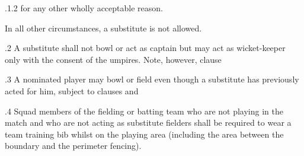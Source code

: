 \documentclass[12pt]{article}
\begin{document}
\vspace{\baselineskip}
\begin{adjustwidth}{0.49in}{0.0in}
{\fontsize{9pt}{10.8pt}.1.2 \tabto{1.17in} for any other wholly acceptable reason.\par}\par

\end{adjustwidth}


\vspace{\baselineskip}
\begin{adjustwidth}{0.5in}{0.0in}
{\fontsize{9pt}{10.8pt}\selectfont In all other circumstances, a substitute is not allowed.\par}\par

\end{adjustwidth}


\vspace{\baselineskip}
\begin{adjustwidth}{0.5in}{0.4in}
{\fontsize{9pt}{10.8pt}.2 \tabto{0.49in} A substitute shall not bowl or act as captain but may act as wicket-keeper only with the consent of the umpires. Note, however, clause \par}\par

\end{adjustwidth}


\vspace{\baselineskip}
\begin{adjustwidth}{0.5in}{0.36in}
{\fontsize{9pt}{10.8pt}.3 \tabto{0.49in} A nominated player may bowl or field even though a substitute has previously acted for him, subject to clauses and \par}\par

\end{adjustwidth}


\vspace{\baselineskip}
\begin{adjustwidth}{0.5in}{0.06in}
{\fontsize{9pt}{10.8pt}.4 \tabto{0.49in} Squad members of the fielding or batting team who are not playing in the match and who are not acting as substitute fielders shall be required to wear a team training bib whilst on the playing area (including the area between the boundary and the perimeter fencing).\par}\par

\end{adjustwidth}
\end{document}
